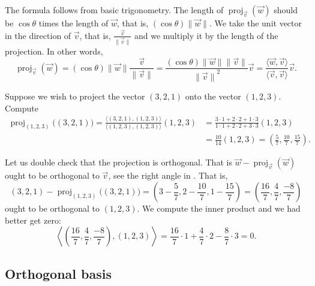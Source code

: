 The formula follows from basic trigonometry.  The length of
$\operatorname{proj}_{\vec{v}}(\vec{w})$ should be
$\cos \theta$ times the length of $\vec{w}$, that is, $(\cos \theta)\lVert\vec{w}\rVert$.
We take the unit vector in the direction of $\vec{v}$, that is,
$\frac{\vec{v}}{\lVert \vec{v} \rVert}$ and we multiply it by the length of
the projection.  In other words,
\begin{equation*}
\operatorname{proj}_{\vec{v}}(\vec{w})
=
(\cos \theta) \lVert \vec{w} \rVert
\frac{\vec{v}}{\lVert \vec{v} \rVert}
=
\frac{(\cos \theta) \lVert \vec{w} \rVert \lVert \vec{v} \rVert}{
{\lVert \vec{v} \rVert}^2
}
\vec{v}
=
\frac{\langle \vec{w}, \vec{v} \rangle}{
\langle \vec{v}, \vec{v} \rangle
}
\vec{v} .
\end{equation*}

\begin{example}
Suppose we wish to project the vector $(3,2,1)$ onto the vector $(1,2,3)$.
Compute
\begin{equation*}
\begin{split}
\operatorname{proj}_{(1,2,3)} \bigl( (3,2,1) \bigr)
=
\frac{\langle (3,2,1) , (1,2,3) \rangle}{\langle (1,2,3) , (1,2,3) \rangle}
(1,2,3)
& =
\frac{3 \cdot 1 + 2 \cdot 2 + 1 \cdot 3}{ 1 \cdot 1 + 2 \cdot 2 + 3 \cdot 3}
(1,2,3)
\\
& =
\frac{10}{14}
(1,2,3)
=
\left(\frac{5}{7},\frac{10}{7},\frac{15}{7}\right) .
\end{split}
\end{equation*}

Let us double check that the projection is orthogonal.  That is
$\vec{w}-\operatorname{proj}_{\vec{v}}(\vec{w})$ ought to be orthogonal to
$\vec{v}$, see the right angle in .  That is,
\begin{equation*}
(3,2,1) - \operatorname{proj}_{(1,2,3)} \bigl( (3,2,1) \bigr)
=
\left(3-\frac{5}{7},2-\frac{10}{7},1-\frac{15}{7}\right)
=
\left(\frac{16}{7},\frac{4}{7},\frac{-8}{7}\right)
\end{equation*}
ought to be orthogonal to $(1,2,3)$.  We compute the inner product and we
had better get zero:
\begin{equation*}
\left\langle
\left(\frac{16}{7},\frac{4}{7},\frac{-8}{7}\right)
,
(1,2,3)
\right\rangle
=
\frac{16}{7} \cdot 1 + \frac{4}{7} \cdot 2 -\frac{8}{7} \cdot 3
=
0 .
\end{equation*}
\end{example}

\subsection{Orthogonal basis}


